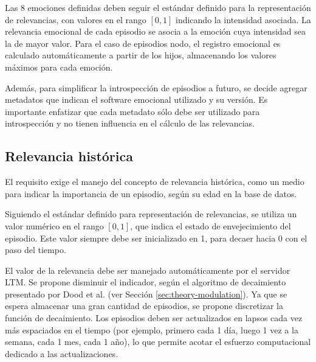 Las 8 emociones definidas deben seguir el estándar definido para la representación de relevancias, con valores en el rango $[0, 1]$ indicando la intensidad asociada. La relevancia emocional de cada episodio se asocia a la emoción cuya intensidad sea la de mayor valor. Para el caso de episodios nodo, el registro emocional es calculado automáticamente a partir de los hijos, almacenando los valores máximos para cada emoción.

Además, para simplificar la introspección de episodios a futuro, se decide agregar metadatos que indican el software emocional utilizado y su versión. Es importante enfatizar que cada metadato sólo debe ser utilizado para introspección y no tienen influencia en el cálculo de las relevancias.


\subsection{Relevancia histórica}\label{sec:design_ep_rel_hist}

El requisito  exige el manejo del concepto de relevancia histórica, como un medio para indicar la importancia de un episodio, según su edad en la base de datos. 

Siguiendo el estándar definido para representación de relevancias, se utiliza un valor numérico en el rango $[0, 1]$, que indica el estado de envejecimiento del episodio. Este valor siempre debe ser inicializado en 1, para decaer hacia 0 con el paso del tiempo.

El valor de la relevancia debe ser manejado automáticamente por el servidor LTM. Se propone disminuir el indicador, según el algoritmo de decaimiento presentado por Dood et al. (ver Sección \ref{sec:theory-modulation}). Ya que se espera almacenar una gran cantidad de episodios, se propone discretizar la función de decaimiento. Los episodios deben ser actualizados en lapsos cada vez más espaciados en el tiempo (por ejemplo, primero cada 1 día, luego 1 vez a la semana, cada 1 mes, cada 1 año), lo que permite acotar el esfuerzo computacional dedicado a las actualizaciones.


